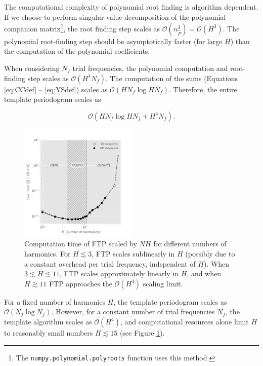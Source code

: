 \documentclass[iop]{emulateapj}
\newcommand{\bigO}{\mathcal{O}}
\begin{document}
The computational complexity of polynomial root finding
is algorithm dependent. If we choose to perform singular value decomposition of
the polynomial companion matrix\footnote{The \texttt{numpy.polynomial.polyroots} 
function uses this method.}, the root finding step scales as 
$\bigO(n_{\hat{P}}^3) = \bigO(H^3)$. The polynomial root-finding step 
should be asymptotically faster (for large $H$) than the computation of 
the polynomial coefficients.

When considering $N_f$ trial frequencies, the polynomial computation and root-finding 
step scales as $\bigO(H^4N_f)$. The computation of the sums 
(Equations \ref{eq:CCdef} -- \ref{eq:YSdef}) scales as $\bigO(HN_f\log HN_f)$.
Therefore, the entire template periodogram scales as 

\begin{equation}
\bigO(HN_f \log HN_f + H^4N_f).
\end{equation}

\begin{figure}
    \centering
    \includegraphics[width=0.5\textwidth]{plots/timing_vs_nharm.png}
    \caption{\label{fig:timingnharm} Computation time of FTP scaled by $NH$ for
            different numbers of harmonics. For $H\lesssim 3$, FTP scales
            sublinearly in $H$ (possibly due to a constant overhead per
            trial frequency, independent of $H$). When $3 \lesssim H \lesssim 11$,
            FTP scales approximately linearly in $H$, and when $H \gtrsim 11$
            FTP approaches the $\bigO(H^4)$ scaling limit.}
\end{figure}

For a fixed number of harmonics $H$, the template periodogram scales as
$\bigO(N_f\log N_f)$. However, for a constant number of trial frequencies $N_f$, 
the template algorithm scales as $\bigO(H^4)$, and computational resources
alone limit $H$ to reasonably small numbers $H\lesssim15$ (see Figure \ref{fig:timingnharm}).
\end{document}
